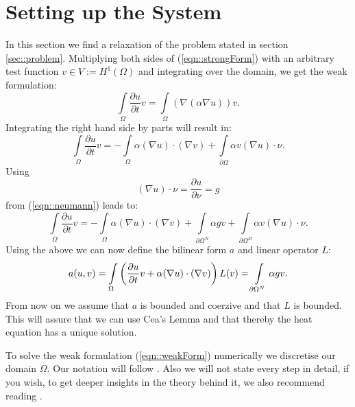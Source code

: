 
\section{\label{sec::setupSystem}Setting up the System}
In this section we find a relaxation of the problem stated in section \ref{sec::problem}. Multiplying both sides of (\ref{eqn::strongForm}) with an arbitrary test function $v\in V:=H^1(\Omega)$ and integrating over the domain, we get the weak formulation:
\begin{equation*}
        \int\limits_{\Omega} \frac{\partial u}{\partial t} v = \int\limits_{\Omega} (\nabla(\alpha\nabla u)) v.
\end{equation*}
Integrating the right hand side by parts will result in:
\begin{equation*}
        \int\limits_{\Omega} \frac{\partial u}{\partial t} v = -\int\limits_{\Omega} \alpha(\nabla u) \cdot (\nabla v) + \int\limits_{\partial \Omega} \alpha v (\nabla u) \cdot \nu.
\end{equation*}
Using
\begin{equation*}
        (\nabla u)\cdot \nu = \frac{\partial u}{\partial \nu} = g
\end{equation*}
from (\ref{eqn::neumann}) leads to:
\begin{equation}
        \label{eqn::weakForm}
        \int\limits_{\Omega} \frac{\partial u}{\partial t} v = -\int\limits_{\Omega} \alpha(\nabla u) \cdot (\nabla v) +  \int\limits_{\partial\Omega^N} \alpha gv + \int\limits_{\partial \Omega^D} \alpha v (\nabla u) \cdot \nu.
\end{equation}
Using the above we can now define the bilinear form $a$ and linear operator $L$:
\begin{equation}
        a(u,v)=\int\limits_{\Omega} \left(\frac{\partial u}{\partial t} v +  \alpha(\nabla u) \cdot (\nabla v) \right) \\
        L(v) = \int\limits_{\partial\Omega^N} \alpha gv.
\end{equation}
From now on we assume that $a$ is bounded and coerzive and that $L$ is bounded. This will assure that we can use Cea's Lemma \cite{quarteroni2009numerical} and that thereby the heat equation has a unique solution.

To solve the weak formulation (\ref{eqn::weakForm}) numerically we discretise our domain $\Omega$. Our notation will follow \cite{quarteroni2009numerical}. Also we will not state every step in detail, if you wish, to get deeper insights in the theory behind it, we also recommend reading \cite{quarteroni2009numerical}.

